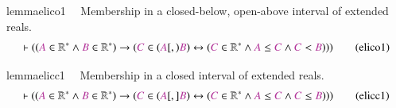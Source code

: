 \begin{restatable}{lemma}{elico1}~~ Membership in a closed-below, open-above
interval of extended reals.
       ~  ~
\begin{align}
\vdash ( ( \mc{A} \in \mathbb{R}^{\ast} \wedge \mc{B} \in \mathbb{R}^{\ast} )
    \rightarrow ( \mc{C} \in ( \mc{A} [,) \mc{B} ) \leftrightarrow ( \mc{C} \in
    \mathbb{R}^{\ast} \wedge \mc{A} \le \mc{C} \wedge \mc{C} < \mc{B} ) )
    )\label{eq:elico1}\tag{elico1}
\end{align}
\end{restatable}

\begin{restatable}{lemma}{elicc1}~~ Membership in a closed interval of extended
reals.  ~  ~
\begin{align}
\vdash ( ( \mc{A} \in \mathbb{R}^{\ast} \wedge \mc{B} \in \mathbb{R}^{\ast} )
    \rightarrow ( \mc{C} \in ( \mc{A} [,] \mc{B} ) \leftrightarrow ( \mc{C} \in
    \mathbb{R}^{\ast} \wedge \mc{A} \le \mc{C} \wedge \mc{C} \le \mc{B} ) )
    )\label{eq:elicc1}\tag{elicc1}
\end{align}
\end{restatable}

